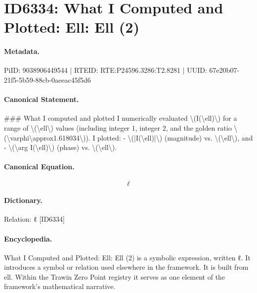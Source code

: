 \section*{ID6334: What I Computed and Plotted: Ell: Ell (2)}
\paragraph{Metadata.}
PiID: 9038906449544 | RTEID: RTE:P24596.3286:T2.8281 | UUID: 67e20b07-21f5-5b59-88cb-0aeeac45f5d6

\paragraph{Canonical Statement.}
\#\#\# What I computed and plotted I numerically evaluated \textbackslash{}(I(\textbackslash{}ell)\textbackslash{}) for a range of \textbackslash{}(\textbackslash{}ell\textbackslash{}) values (including integer 1, integer 2, and the golden ratio \textbackslash{}(\textbackslash{}varphi\textbackslash{}approx1.618034\textbackslash{})). I plotted: - \textbackslash{}(|I(\textbackslash{}ell)|\textbackslash{}) (magnitude) vs. \textbackslash{}(\textbackslash{}ell\textbackslash{}), and - \textbackslash{}(\textbackslash{}arg I(\textbackslash{}ell)\textbackslash{}) (phase) vs. \textbackslash{}(\textbackslash{}ell\textbackslash{}).

\paragraph{Canonical Equation.}
\[
\ell
\]

\paragraph{Dictionary.}
Relation: ℓ [ID6334]

\paragraph{Encyclopedia.}
What I Computed and Plotted: Ell: Ell (2) is a symbolic expression, written ℓ. It introduces a symbol or relation used elsewhere in the framework. It is built from ell. Within the Trawin Zero Point registry it serves as one element of the framework's mathematical narrative.

